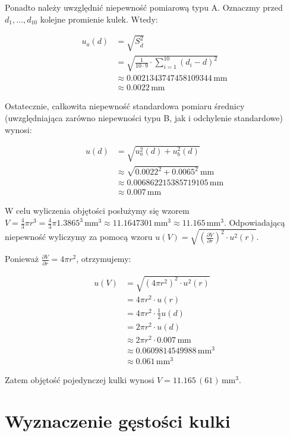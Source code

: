 \documentclass[a4paper]{article}
\begin{document}
Ponadto należy uwzględnić niepewność pomiarową typu A.
Oznaczmy przed $d_1, \dots, d_{10}$ kolejne promienie kulek.
Wtedy:

\begin{align*}
	u_a(d) &= \sqrt{S^{2}_{\overline{d}}} \\
	&= \sqrt{\frac{1}{10 \cdot 9} \cdot \sum_{i=1}^{10} (d_i - d)^2} \\
	&\approx 0.0021343747458109344 \, \text{mm} \\
	&\approx 0.0022 \, \text{mm}
\end{align*}

Ostatecznie, całkowita niepewność standardowa pomiaru średnicy (uwzględniająca zarówno niepewności typu B, jak i odchylenie standardowe) wynosi:

\begin{align*}
	u(d) &= \sqrt{u_a^2(d) + u_b^2(d)} \\
	&\approx \sqrt{0.0022^2 + 0.0065^2} \, \text{mm} \\
	&\approx 0.006862215385719105 \, \text{mm} \\
	&\approx 0.007 \, \text{mm}
\end{align*}

W celu wyliczenia objętości posłużymy się wzorem $V = \frac 4 3 \pi r^3 = \frac 4 3 \pi 1.3865^3 \, \text{mm}^3 \approx 11.1647301 \, \text{mm}^3 \approx 11.165 \, \text{mm}^3$.
Odpowiadającą niepewność wyliczymy za pomocą wzoru $u(V) = \sqrt{\left(\frac{\partial V}{\partial r}\right)^2 \cdot u^2(r)}$.

Ponieważ $\frac{\partial V}{\partial r} = 4 \pi r^2$, otrzymujemy:

\begin{align*}
	u(V) &= \sqrt{\left(4 \pi r^2\right)^2 \cdot u^2(r)} \\
	&= 4 \pi r^2 \cdot u(r) \\
	&= 4 \pi r^2 \cdot \frac 1 2 u(d) \\
	&= 2 \pi r^2 \cdot u(d) \\
	&\approx 2 \pi r^2 \cdot 0.007 \, \text{mm} \\
	&\approx 0.0609814549988 \, \text{mm}^3 \\
	&\approx 0.061 \, \text{mm}^3
\end{align*}

Zatem objętość pojedynczej kulki wynosi $V = 11.165 \, (61) \, \text{mm}^3$.

\section{Wyznaczenie gęstości kulki}
\end{document}
